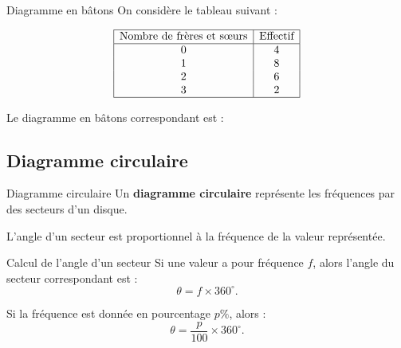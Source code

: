\documentclass[11pt,a4paper]{article}
\begin{document}
\begin{examplebox}{Diagramme en bâtons}
On considère le tableau suivant :

\[
\begin{array}{|c|c|}
\hline
\text{Nombre de frères et sœurs} & \text{Effectif} \\
\hline
0 & 4 \\
1 & 8 \\
2 & 6 \\
3 & 2 \\
\hline
\end{array}
\]

Le diagramme en bâtons correspondant est :

\begin{center}
\end{center}
\end{examplebox}

\subsection{Diagramme circulaire}

\begin{definitionbox}{Diagramme circulaire}
Un \textbf{diagramme circulaire} représente les fréquences par des secteurs d'un disque.

L'angle d'un secteur est proportionnel à la fréquence de la valeur représentée.
\end{definitionbox}

\begin{propositionbox}{Calcul de l'angle d'un secteur}
Si une valeur a pour fréquence $f$, alors l'angle du secteur correspondant est :
\[
\theta=f\times 360^\circ.
\]

Si la fréquence est donnée en pourcentage $p\%$, alors :
\[
\theta=\frac{p}{100}\times 360^\circ.
\]
\end{propositionbox}
\end{document}
